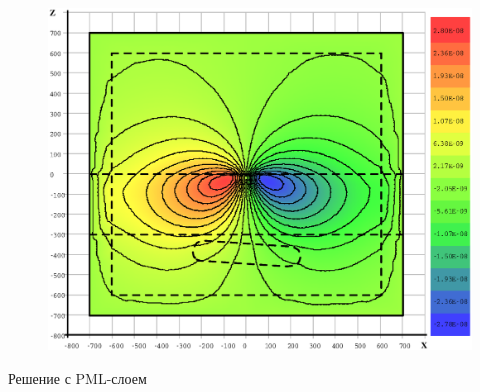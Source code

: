 \documentclass[aspectratio=43]{beamer}
\begin{document}
\begin{frame}
\begin{columns}[t,totalwidth=\linewidth]
\begin{column}{.5\linewidth}
\begin{figure}[H]
				\includegraphics[width=1.1\textwidth,height=1.1\textheight,keepaspectratio]{airloop_pml_y=0_EyR.eps}
			\end{figure}
			\begin{center}
				\vspace{-1em}
				\tiny{Решение с PML-слоем}
			\end{center}
		\end{column}
	\end{columns}
\end{frame}

\end{document}
